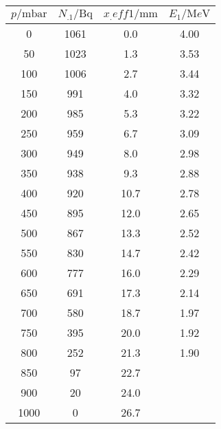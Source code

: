 \label{tab:tab1}
	\begin{tabular}{S[table-format=3.0]S[table-format=3.0]S[table-format=2.1]S[table-format=1.2]}
		\toprule
		{$p/\si{\milli\bar}$} & {$N_.1/\si{\becquerel}$} & {$x_.{eff1}/\si{\milli\metre}$} & {$E_1/\si{\mega e\volt}$} \\
		 & 1061 & 0.0 & 4.00 \\
		 50 & 1023 & 1.3 & 3.53 \\
		100 & 1006 & 2.7 & 3.44 \\
		150 & 991 & 4.0 & 3.32 \\
		200 & 985 & 5.3 & 3.22 \\
		250 & 959 & 6.7 & 3.09 \\
		300 & 949 & 8.0 & 2.98 \\
		350 & 938 & 9.3 & 2.88 \\
		400 & 920 & 10.7 & 2.78 \\
		450 & 895 & 12.0 & 2.65 \\
		500 & 867 & 13.3 & 2.52 \\
		550 & 830 & 14.7 & 2.42 \\
		600 & 777 & 16.0 & 2.29 \\
		650 & 691 & 17.3 & 2.14 \\
		700 & 580 & 18.7 & 1.97 \\
		750 & 395 & 20.0 & 1.92 \\
		800 & 252 & 21.3 & 1.90 \\
		850 &  97 & 22.7 &  \\
		900 &  20 & 24.0 &  \\
		1000 &   0 & 26.7 &  \\
		\bottomrule
	\end{tabular}
